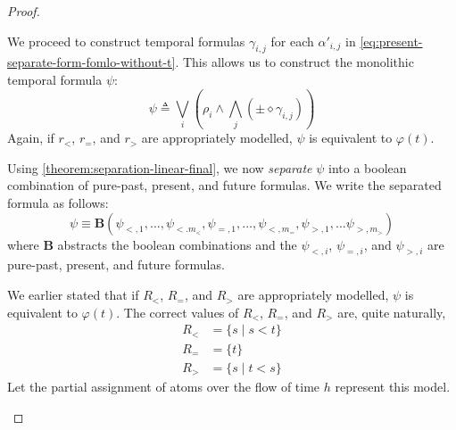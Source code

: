 \documentclass[a4paper,UKenglish,cleveref, autoref, thm-restate, numberwithinsect]{lipics-v2021}
\begin{document}
\begin{proof}
\begin{description}
        We proceed to construct temporal formulas $\gamma_{i, j}$ for each $\alpha'_{i, j}$ in \eqref{eq:present-separate-form-fomlo-without-t}. This allows us to construct the monolithic temporal formula $\psi$:
        \begin{equation*}
            \psi \triangleq \bigvee_i \left( \rho_i \land \bigwedge_j \left( \pm \diamond \gamma_{i, j} \right) \right)
        \end{equation*}
        Again, if $r_<$, $r_=$, and $r_>$ are appropriately modelled, $\psi$ is equivalent to $\varphi(t)$.

        Using \cref{theorem:separation-linear-final}, we now \textit{separate} $\psi$ into a boolean combination of pure-past, present, and future formulas. We write the separated formula as follows:
        \begin{equation*}
            \psi \equiv \mathbf{B}(\psi_{<, 1}, \ldots, \psi_{<. m_<}, \psi_{=, 1}, \ldots, \psi_{<, m_=}, \psi_{>, 1}, \ldots \psi_{>, m_>})
        \end{equation*}
        where $\mathbf{B}$ abstracts the boolean combinations and the $\psi_{<, i}$, $\psi_{=, i}$, and $\psi_{>, i}$ are pure-past, present, and future formulas.

        We earlier stated that if $R_<$, $R_=$, and $R_>$ are appropriately modelled, $\psi$ is equivalent to $\varphi(t)$. The correct values of $R_<$, $R_=$, and $R_>$ are, quite naturally,
        \begin{equation*}
            \begin{aligned}
                R_< &= \{s \mid s < t\}\\
                R_= &= \{t\}\\
                R_> &= \{s \mid t < s\}
            \end{aligned}
        \end{equation*}
        Let the partial assignment of atoms over the flow of time $h$ represent this model.


\end{description}
\end{proof}
\end{document}
